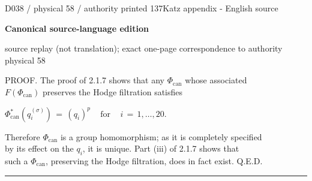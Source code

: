 \documentclass[9pt]{article}
\newcommand{\CanonText}[1]{\par{\fontsize{8.0}{9.35}\selectfont\RaggedRight #1\par}\vspace{2.2pt}}
\newcommand{\CanonDisplay}[1]{\par\vspace{1.2pt}\begin{center}{\fontsize{7.2}{8.4}\selectfont\(\displaystyle #1\)}\end{center}\vspace{1.2pt}}
\newcommand{\LayerTitle}{Canonical source-language edition}
\begin{document}
\noindent\begin{minipage}[t][\dimexpr\textheight-5pt\relax][t]{\textwidth}
{\sffamily\fontsize{7.3}{8.2}\selectfont\color{Quiet} D038 / physical 58 / authority printed 137\hfill Katz appendix - English source}
\par{}\vspace{4.5pt}
{\sffamily\fontsize{10.4}{11.6}\selectfont\bfseries\color{Accent} \LayerTitle}
\par{\sffamily\fontsize{6.7}{7.7}\selectfont\color{Quiet} source replay (not translation); exact one-page correspondence to authority physical 58}
\vspace{5pt}
\CanonText{PROOF. The proof of 2.1.7 shows that any \(\Phi{}_{\mathrm{can}}\) whose associated\\\(F(\Phi{}_{\mathrm{can}})\) preserves the Hodge filtration satisfies}
\CanonDisplay{\Phi{}_{\mathrm{can}}^{*}(q_{i}^{(\sigma{})})\,=\,(q_{i})^{p}\quad\,\text{for}\quad\,i\,=\,1,\ldots{},20.}
\CanonText{Therefore \(\Phi{}_{\mathrm{can}}\) is a group homomorphism; as it is completely specified\\by its effect on the \(q_{i}\), it is unique. Part (iii) of 2.1.7 shows that\\such a \(\Phi{}_{\mathrm{can}}\), preserving the Hodge filtration, does in fact exist. Q.E.D.}
\vfill
{\color{Accent}\hrule height 0.35pt}\vspace{3pt}
\end{minipage}
\end{document}
